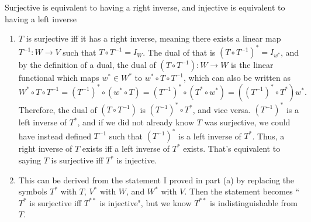 \documentclass{article}
\begin{document}
\bigskip
\par
\begin{prob}
\end{prob}
Surjective is equivalent to having a right inverse, and injective is equivalent to having a left inverse
\begin{enumerate}[label=(\alph*)]
    \item $T$ is surjective iff it has a right inverse, meaning there exists a linear map $T^{-1}: W \rightarrow V$ such that $T \circ T^{-1} = I_W$. The dual of that is $(T \circ T^{-1})^* = I_{w^*}$, and by the definition of a dual, the dual of $(T \circ T^{-1}) : W \rightarrow W$ is the linear functional which maps $w^* \in W^*$ to $w^* \circ T \circ T^{-1}$, which can also be written as
        \[ W^* \circ T \circ T^{-1} = (T^{-1})^* \circ (w^* \circ T) = (T^{-1})^* \circ (T^* \circ w^*) = ((T^{-1})^* \circ T^*) w^*. \]
        Therefore, the dual of $(T \circ T^{-1})$ is $(T^{-1})^* \circ T^*$, and vice versa. $(T^{-1})^*$ is a left inverse of $T^*$, and if we did not already know $T$ was surjective, we could have instead defined $T^{-1}$ such that $(T^{-1})^*$ is a left inverse of $T^*$. Thus, a right inverse of $T$ exists iff a left inverse of $T^*$ exists. That's equivalent to saying $T$ is surjective iff $T^*$ is injective.
    \item This can be derived from the statement I proved in part (a) by replacing the symbols $T^*$ with $T$, $V^*$ with $W$, and $W^*$ with $V$. Then the statement becomes ``$T^*$ is surjective iff $T^{**}$ is injective", but we know $T^{**}$ is indistinguishable from $T$.
\end{enumerate}
\end{document}
